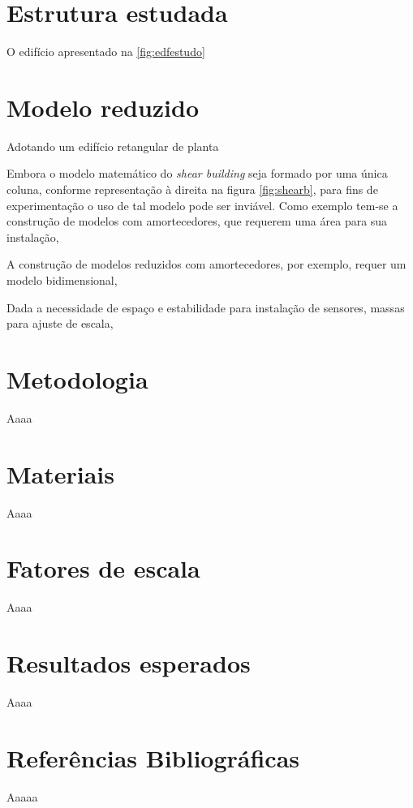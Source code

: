 \section{Estrutura estudada}

O edifício apresentado na \ref{fig:edfestudo} 





\section{Modelo reduzido}



Adotando um edifício retangular de planta 

Embora o modelo matemático do \textit{shear building} seja formado por uma única coluna, conforme representação à direita na figura \ref{fig:shearb}, para fins de experimentação o uso de tal modelo pode ser inviável. Como exemplo tem-se a construção de modelos com amortecedores, que requerem uma área para sua instalação, 

A construção de modelos reduzidos com amortecedores, por exemplo, requer um modelo bidimensional, 

Dada a necessidade de espaço e estabilidade para instalação de sensores, massas para ajuste de escala, 



\section{Metodologia}
Aaaa


\section{Materiais}
Aaaa


\section{Fatores de escala}
Aaaa


\section{Resultados esperados}
Aaaa


\section{Referências Bibliográficas}
Aaaaa
    




